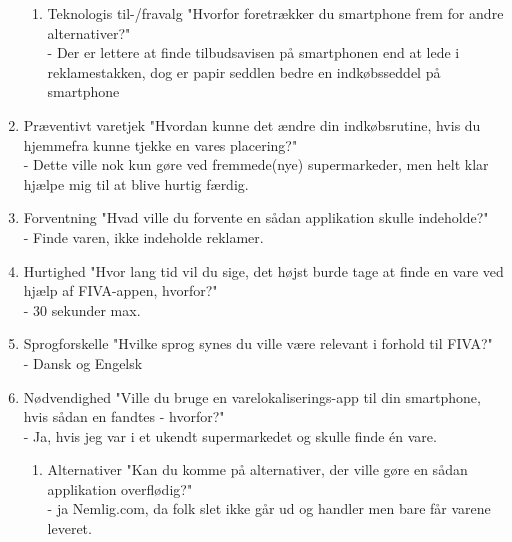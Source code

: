 \begin{enumerate}
\begin{enumerate}
\item Teknologis til-/fravalg "Hvorfor foretrækker du smartphone frem for andre alternativer?"\\
  - Der er lettere at finde tilbudsavisen på smartphonen end at lede i reklamestakken, dog er papir seddlen bedre en indkøbsseddel på smartphone
\end{enumerate}

\item Præventivt varetjek "Hvordan kunne det ændre din indkøbsrutine, hvis du hjemmefra kunne tjekke en vares placering?"\\
  - Dette ville nok kun gøre ved fremmede(nye) supermarkeder, men helt klar hjælpe mig til at blive hurtig færdig.
\item Forventning "Hvad ville du forvente en sådan applikation skulle indeholde?"\\
  - Finde varen, ikke indeholde reklamer.
\item Hurtighed	"Hvor lang tid vil du sige, det højst burde tage at finde en vare ved hjælp af FIVA-appen, hvorfor?"\\
  - 30 sekunder max.
\item Sprogforskelle "Hvilke sprog synes du ville være relevant i forhold til FIVA?"\\
  - Dansk og Engelsk
\item Nødvendighed "Ville du bruge en varelokaliserings-app til din smartphone, hvis sådan en fandtes - hvorfor?"\\
  - Ja, hvis jeg var i et ukendt supermarkedet og skulle finde én vare.
\begin{enumerate}
\item Alternativer "Kan du komme på alternativer, der ville gøre en sådan applikation overflødig?"\\
  - ja Nemlig.com, da folk slet ikke går ud og handler men bare får varene leveret.
\end{enumerate}




\end{enumerate}
